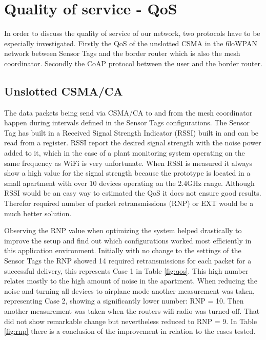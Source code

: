 \section{Quality of service - QoS}

In order to discuss the quality of service of our network, two protocols have to be especially investigated. Firstly the QoS of the unslotted CSMA in the 6loWPAN network between Sensor Tags and the border router which is also the mesh coordinator. Secondly the CoAP protocol between the user and the border router.

\subsection{Unslotted CSMA/CA}

The data packets being send via CSMA/CA to and from the mesh coordinator happen during intervals defined in the Sensor Tags configurations. The Sensor Tag has built in a Received Signal Strength Indicator (RSSI) built in and can be read from a register. RSSI report the desired signal strength with the noise power added to it, which in the case of a plant monitoring system operating on the same frequency as WiFi is very unfortunate. When RSSI is measured it always show a high value for the signal strength because the prototype is located in a small apartment with over 10 devices operating on the 2.4GHz range. Although RSSI would be an easy way to estimated the QoS it does not ensure good results. Therefor required number of packet retransmissions (RNP) or EXT would be a much better solution.

Observing the RNP value when optimizing the system helped drastically to improve the setup and find out which configurations worked most efficiently in this application environment. Initially with no change to the settings of the Sensor Tags the RNP showed 14 required retransmissions for each packet for a successful delivery, this represents Case 1 in Table \ref{fig:qos}. This high number relates mostly to the high amount of noise in the apartment. When reducing the noise and turning all devices to airplane mode another measurement was taken, representing Case 2, showing a significantly lower number: RNP = 10. Then another measurement was taken when the routers wifi radio was turned off. That did not show remarkable change but nevertheless reduced to RNP = 9. In Table \ref{fig:rnp} there is a conclusion of the improvement in relation to the cases tested.

